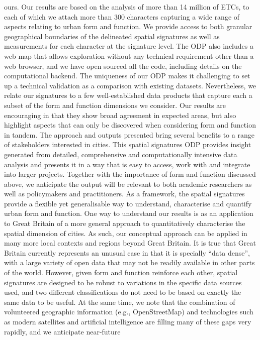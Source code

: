 \documentclass[fleqn,10pt]{wlscirep}
\begin{document}
ours.
Our results are based on the analysis of more than 14 million of ETCs, to
each of which we attach more than 300 characters capturing a wide range of
aspects relating to urban form and function.
We provide access to both granular geographical boundaries of the delineated spatial signatures
as well as measurements for each character at the signature level.
The ODP also includes a web map that allows exploration without any technical
requirement other than a web browser, and we have open sourced all the code,
including details on the computational backend.
The uniqueness of our ODP makes it challenging to set up a technical validation as a
comparison with existing datasets. Nevertheless, we relate our
signatures to a few well-established data products that capture each a subset
of the form and function dimensions we consider. Our results are encouraging
in that they show broad agreement in expected areas, but also highlight
aspects that can only be discovered when considering form and function in tandem.
The approach and outputs presented bring several benefits to a range of
stakeholders interested in cities.
This spatial signatures ODP provides insight generated from detailed,
comprehensive and computationally intensive data analysis and presents it in a
way that is easy to access, work with and integrate into larger projects.
Together with the importance of form and function discussed above, we
anticipate the output will be relevant to both academic researchers as well as
policymakers and practitioners.
As a framework, the spatial signatures provide a flexible yet
generalisable way to understand, characterise and quantify urban form and
function.
One way to understand our results is as an application to Great
Britain of a more general approach to quantitatively characterise the spatial dimension of cities.
As such, our conceptual approach can be applied in many more
local contexts and regions beyond Great Britain.
It is true that Great Britain currently represents an unusual case in that it
is specially ``data dense'', with a large variety of open data that may not be
readily available in other parts of the world. However, given form and
function reinforce each other, spatial signatures are designed to be robust to
variations in the specific data sources used, and two different
classifications do not need to be based on exactly the same data to be useful.
At the same time, we note that
the combination of volunteered geographic information (e.g., OpenStreetMap)
and technologies such as modern satellites and artificial intelligence are
filling many of these gaps very rapidly, and we anticipate near-future
\end{document}
